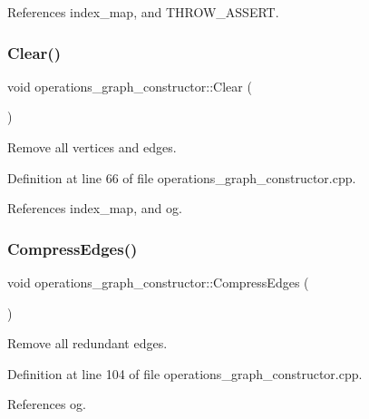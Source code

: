 References index\+\_\+map, and T\+H\+R\+O\+W\+\_\+\+A\+S\+S\+E\+RT.

\mbox{\label{classoperations__graph__constructor_ad1f93cb580bb9b0fbee3ff28c124929a}} 
\subsubsection{\texorpdfstring{Clear()}{Clear()}}
{\footnotesize\ttfamily void operations\+\_\+graph\+\_\+constructor\+::\+Clear (\begin{DoxyParamCaption}{ }\end{DoxyParamCaption})}



Remove all vertices and edges. 



Definition at line 66 of file operations\+\_\+graph\+\_\+constructor.\+cpp.



References index\+\_\+map, and og.

\mbox{\label{classoperations__graph__constructor_adc71534552b58f6c0a3b9b254fe09617}} 
\subsubsection{\texorpdfstring{Compress\+Edges()}{CompressEdges()}}
{\footnotesize\ttfamily void operations\+\_\+graph\+\_\+constructor\+::\+Compress\+Edges (\begin{DoxyParamCaption}{ }\end{DoxyParamCaption})}



Remove all redundant edges. 



Definition at line 104 of file operations\+\_\+graph\+\_\+constructor.\+cpp.



References og.

